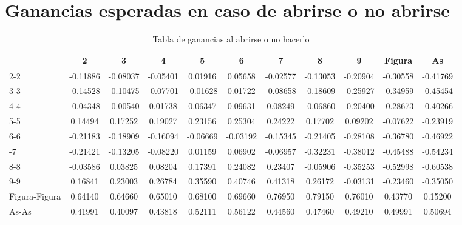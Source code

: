\documentclass[12pt,a4paper,]{book}
\numberwithin{dummy}{section}
\theoremstyle{ocrenumbox}
\theoremstyle{blacknumex}
\theoremstyle{blacknumbox}
\theoremstyle{ocrenum}
\theoremstyle{ocrenum}
\begin{document}
\hypertarget{ganancias-esperadas-en-caso-de-abrirse-o-no-abrirse}{%
\section{Ganancias esperadas en caso de abrirse o no
abrirse}\label{ganancias-esperadas-en-caso-de-abrirse-o-no-abrirse}}

\begingroup\fontsize{12}{14}\selectfont

\begin{longtable}[t]{lcccccccccc}
\caption{\label{tab:unnamed-chunk-10}Tabla de ganancias al abrirse o no hacerlo}\\
\toprule
 & 2 & 3 & 4 & 5 & 6 & 7 & 8 & 9 & Figura & As\\
\midrule
2-2 & -0.11886 & -0.08037 & -0.05401 & 0.01916 & 0.05658 & -0.02577 & -0.13053 & -0.20904 & -0.30558 & -0.41769\\
3-3 & -0.14528 & -0.10475 & -0.07701 & -0.01628 & 0.01722 & -0.08658 & -0.18609 & -0.25927 & -0.34959 & -0.45454\\
4-4 & -0.04348 & -0.00540 & 0.01738 & 0.06347 & 0.09631 & 0.08249 & -0.06860 & -0.20400 & -0.28673 & -0.40266\\
5-5 & 0.14494 & 0.17252 & 0.19027 & 0.23156 & 0.25304 & 0.24222 & 0.17702 & 0.09202 & -0.07622 & -0.23919\\
6-6 & -0.21183 & -0.18909 & -0.16094 & -0.06669 & -0.03192 & -0.15345 & -0.21405 & -0.28108 & -0.36780 & -0.46922\\
\addlinespace
7-7 & -0.21421 & -0.13205 & -0.08220 & 0.01159 & 0.06902 & -0.06957 & -0.32231 & -0.38012 & -0.45488 & -0.54234\\
8-8 & -0.03586 & 0.03825 & 0.08204 & 0.17391 & 0.24082 & 0.23407 & -0.05906 & -0.35253 & -0.52998 & -0.60538\\
9-9 & 0.16841 & 0.23003 & 0.26784 & 0.35590 & 0.40746 & 0.41318 & 0.26172 & -0.03131 & -0.23460 & -0.35050\\
Figura-Figura & 0.64140 & 0.64660 & 0.65010 & 0.68100 & 0.69660 & 0.76950 & 0.79150 & 0.76010 & 0.43770 & 0.15200\\
As-As & 0.41991 & 0.40097 & 0.43818 & 0.52111 & 0.56122 & 0.44560 & 0.47460 & 0.49210 & 0.49991 & 0.50694\\
\bottomrule
\end{longtable}
\endgroup{}




%
\end{document}
